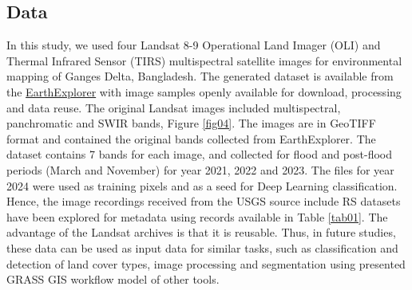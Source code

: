 \documentclass[water,article,submit,pdftex,moreauthors]{Definitions/mdpi}
\begin{document}
\subsection{Data}
In this study, we used four Landsat 8-9 Operational Land Imager (OLI) and Thermal Infrared Sensor (TIRS) multispectral satellite images for environmental mapping of Ganges Delta, Bangladesh. The generated dataset is available from the \href{https://earthexplorer.usgs.gov/}{EarthExplorer} with image samples openly available for download, processing and data reuse. The original Landsat images included multispectral, panchromatic and SWIR bands, Figure \ref{fig04}. The images are in GeoTIFF format and contained the original bands collected from EarthExplorer. The dataset contains 7 bands for each image, and collected for flood and post-flood periods (March and November) for year 2021, 2022 and 2023. The files for year 2024 were used as training pixels and as a seed for Deep Learning classification. Hence, the image recordings received from the USGS source include RS datasets have been explored for metadata using records available in Table \ref{tab01}. The advantage of the Landsat archives is that it is reusable. Thus, in future studies, these data can be used as input data for similar tasks, such as classification and detection of land cover types, image processing and segmentation using presented GRASS GIS workflow model of other tools. 
\end{document}
